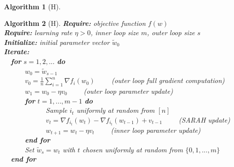 \documentclass[letterpaper,11 pt]{article}
\newtheorem{algorithm}{Algorithm}
\begin{document}
\begin{appendices}
\begin{algorithm}[H]
\end{algorithm}

\begin{algorithm}[H]
\caption{The SARAH algorithm is identical to SVRG except for the \textit{SARAH update}, which modifies the stochastic gradient estimate to use recursive gradient estimate information rather than the initialized gradient to update the gradient estimate in the inner loop.}
\label{alg:sarah}

{\bf Require:}  objective function $f(w)$ \\
{\bf Require:} learning rate $\eta>0$, inner loop size $m$, outer loop size $s$ \\
{\bf Initialize:} initial parameter vector $\tilde{w}_{0}$ \\
{\bf Iterate:} \\
\-\ \-\ {\bf for } $s = 1,2,...$ {\bf do} \\
\-\ \-\ \-\ \-\ \-\ \-\  $w_{0} = \tilde{w}_{s-1}$ \\
\-\ \-\ \-\ \-\ \-\ \-\   $v_{0} = \frac{1}{n}\sum_{i=1}^{n}{\nabla f_{i}(w_{0})}$ \-\ \-\ \-\ \-\  (\textit{outer loop full gradient computation}) \\
\-\ \-\ \-\ \-\ \-\ \-\   $w_{1} = w_{0} - \eta v_{0}$ \-\ \-\ \-\ \-\  (\textit{outer loop parameter update})   \\
\-\ \-\ \-\ \-\ \-\ \-\  {\bf for } $t = 1,...,m-1$ {\bf do} \\
\-\ \-\ \-\ \-\ \-\ \-\ \-\ \-\ \-\ \-\ \-\ \-\    Sample $i_{t}$ uniformly at random from $[n]$ \\
\-\ \-\ \-\ \-\ \-\ \-\ \-\ \-\ \-\ \-\ \-\ \-\    $v_{t} =   \nabla f_{i_{t}}(w_{t})  - \nabla f_{i_{t}}(w_{t-1})  + v_{t-1}$    \-\ \-\ \-\ \-\  (\textit{SARAH update})  \\
\-\ \-\ \-\ \-\ \-\ \-\ \-\ \-\ \-\ \-\ \-\ \-\   $w_{t+1} = w_{t} - \eta v_{t} $ \-\ \-\ \-\ \-\  (\textit{inner loop parameter update}) \\
\-\ \-\ \-\ \-\ \-\ \-\ {\bf end for} \\
\-\ \-\ \-\ \-\ \-\ \-\  Set $\tilde{w}_{s} = w_{t}$ with $t$ chosen uniformly at random from $\{0,1,...,m\}$  \\
\-\ \-\ {\bf end for }
\end{algorithm}

\end{appendices}
\pagebreak

    
 
\end{document}
